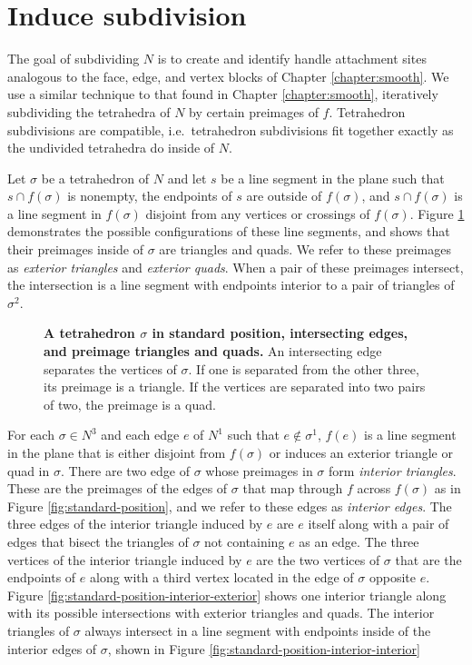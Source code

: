 \section{Induce subdivision}
\label{section:pl-subdivide}

The goal of subdividing $N$ is to create and identify handle attachment sites analogous to the face, edge, and vertex blocks of Chapter \ref{chapter:smooth}.
We use a similar technique to that found in Chapter \ref{chapter:smooth}, iteratively subdividing the tetrahedra of $N$ by certain preimages of $f$.
Tetrahedron subdivisions are compatible, i.e.\ tetrahedron subdivisions fit together exactly as the undivided tetrahedra do inside of $N$.

Let $\sigma$ be a tetrahedron of $N$ and let $s$ be a line segment in the plane such that $s\cap f(\sigma)$ is nonempty, the endpoints of $s$ are outside of $f(\sigma)$,  and $s\cap f(\sigma)$ is a line segment in $f(\sigma)$ disjoint from any vertices or crossings of $f(\sigma)$.
Figure \ref{fig:standard-position-intersection} demonstrates the possible configurations of these line segments, and shows that their preimages inside of $\sigma$ are triangles and quads.
We refer to these preimages as \emph{exterior triangles} and \emph{exterior quads}.
When a pair of these preimages intersect, the intersection is a line segment with endpoints interior to a pair of triangles of $\sigma^2$.

\begin{figure}[h!]
	\caption{
		\textbf{A tetrahedron $\sigma$ in standard position, intersecting edges, and preimage triangles and quads.}
		An intersecting edge separates the vertices of $\sigma$.
		If one is separated from the other three, its preimage is a triangle.
		If the vertices are separated into two pairs of two, the preimage is a quad.
	}
	\label{fig:standard-position-intersection}
\end{figure}

For each $\sigma\in N^3$ and each edge $e$ of $N^1$ such that $e\notin\sigma^1$, $f(e)$ is a line segment in the plane that is either disjoint from $f(\sigma)$ or induces an exterior triangle or quad in $\sigma$.
There are two edge of $\sigma$ whose preimages in $\sigma$ form \emph{interior triangles}.
These are the preimages of the edges of $\sigma$ that map through $f$ across $f(\sigma)$ as in Figure \ref{fig:standard-position}, and we refer to these edges as \emph{interior edges}.
The three edges of the interior triangle induced by $e$ are $e$ itself along with a pair of edges that bisect the triangles of $\sigma$ not containing $e$ as an edge.
The three vertices of the interior triangle induced by $e$ are the two vertices of $\sigma$ that are the endpoints of $e$ along with a third vertex located in the edge of $\sigma$ opposite $e$.
Figure \ref{fig:standard-position-interior-exterior} shows one interior triangle along with its possible intersections with exterior triangles and quads.
The interior triangles of $\sigma$ always intersect in a line segment with endpoints inside of the interior edges of $\sigma$, shown in Figure \ref{fig:standard-position-interior-interior}

